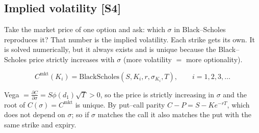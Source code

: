 \documentclass[10pt]{article}
\begin{document}
\subsection{Implied volatility [S4]}
\begin{idea}
Take the market price of one option and ask: which $\sigma$ in Black--Scholes reproduces it? That number is the implied volatility. Each strike gets its own. It is solved numerically, but it always exists and is unique because the Black--Scholes price strictly increases with $\sigma$ (more volatility $=$ more optionality).
\end{idea}
\[C^{\text{mkt}}(K_i)=\mathrm{BlackScholes}(S,K_i,r,\sigma_{K_i},T),\qquad i=1,2,3,\dots\]
\begin{where}
\end{where}
\begin{deriv}
Vega $=\frac{\partial C}{\partial\sigma}=S\phi(d_1)\sqrt T>0$, so the price is strictly increasing in $\sigma$ and the root of $C(\sigma)=C^{\text{mkt}}$ is unique. By put--call parity $C-P=S-Ke^{-rT}$, which does not depend on $\sigma$; so if $\sigma$ matches the call it also matches the put with the same strike and expiry.
\end{deriv}
\end{document}
